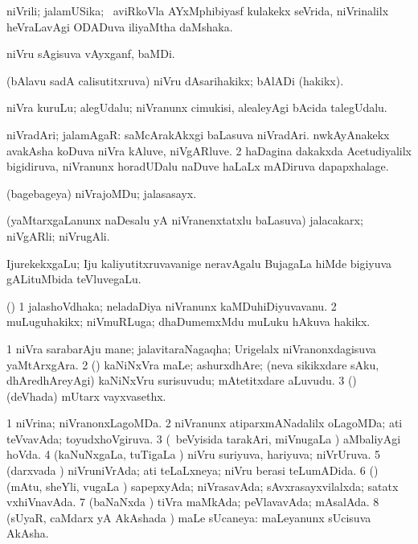 \bentry
{} 
\gl{\nA}
\expl{}
\bmng
niVrili; jalamUSika; \kanmu\ aviRkoVla AYxMphibiyasf kulakekx seVrida, niVrinalilx heVraLavAgi ODADuva iliyaMtha daMshaka. 
\emng
\eentry

\bentry
{} 
\gl{\nA}
\expl{}
\bmng
niVru sAgisuva vAyxganf, baMDi. 
\emng
\eentry

\bentry
{} 
\gl{\nA}
\expl{}
\bmng
(bAlavu sadA calisutitxruva) niVru dAsarihakikx; bAlADi (hakikx). 
\emng
\eentry

\bentry
{} 
\gl{\nA}
\expl{}
\bmng
niVra kuruLu; alegUdalu; niVranunx cimukisi, alealeyAgi bAcida talegUdalu. 
\emng
\eentry

\bentry
{} 
\gl{\nA}
\expl{}
\bmng
\bnum
{} niVradAri; jalamAgaR: 
\banum
{} saMcArakAkxgi baLasuva niVradAri. 
 nwkAyAnakekx avakAsha koDuva niVra kAluve, niVgARluve. 
\eanum
\numie
\num{2} haDagina dakakxda Acetudiyalilx bigidiruva, niVranunx horadUDalu naDuve haLaLx mADiruva dapapxhalage. 
\enum
\emng
\eentry

\bentry
{} 
\gl{\nA}
\expl{}
\bmng
(bagebageya) niVrajoMDu; jalasasayx. 
\emng
\eentry

\bentry
{} 
\gl{\nA}
\expl{}
\bmng
(yaMtarxgaLanunx naDesalu yA niVranenxtatxlu baLasuva) jalacakarx; niVgARli; niVrugAli. 
\emng
\eentry

\bentry
{} 
\gl{\nA}
\expl{}
\bmng
IjurekekxgaLu; Iju kaliyutitxruvavanige neravAgalu BujagaLa hiMde bigiyuva gALituMbida teVluvegaLu. 
\emng
\eentry

\bentry
{} 
\gl{\nA}
\expl{}
\bmng
(\ame) 
\bnum
\num{1} jalashoVdhaka; neladaDiya niVranunx kaMDuhiDiyuvavanu. 
\num{2} muLuguhakikx; niVmuRLuga; dhaDumemxMdu muLuku hAkuva hakikx. 
\enum
\emng
\eentry

\bentry
{} 
\gl{\nA}
\expl{}
\bmng
\bnum
\num{1} niVra sarabarAju mane; jalavitaraNagaqha; Urigelalx niVranonxdagisuva yaMtArxgAra. 
\num{2} (\ashi) kaNiNxVra maLe; ashurxdhAre; (neva sikikxdare sAku, dhAredhAreyAgi) kaNiNxVru surisuvudu; mAtetitxdare aLuvudu. 
\num{3} (\ashi) (deVhada) mUtarx vayxvasethx. 
\enum
\emng
\eentry

\bentry
{} 
\gl{\gu}
\expl{}
\bmng
\bnum
\num{1} niVrina; niVranonxLagoMDa. 
\num{2} niVranunx atiparxmANadalilx oLagoMDa; ati teVvavAda; toyudxhoVgiruva. 
\num{3} (\kanmu\ beVyisida tarakAri, miVnugaLa \vi) aMbaliyAgi hoVda. 
\num{4} (kaNuNxgaLa, tuTigaLa \vi) niVru suriyuva, hariyuva; niVrUruva. 
\num{5} (darxvada \vi) niVruniVrAda; ati teLaLxneya; niVru berasi teLumADida. 
\num{6} (\rUpa) (mAtu, sheYli, \mo vugaLa \vi) sapepxyAda; niVrasavAda; sAvxrasayxvilalxda; satatx vxhiVnavAda. 
\num{7} (baNaNxda \vi) tiVra maMkAda; peVlavavAda; mAsalAda. 
\num{8} (sUyaR, caMdarx yA AkAshada \vi) maLe sUcaneya:  maLeyanunx sUcisuva AkAsha. 
\enum
\emng
\eentry

